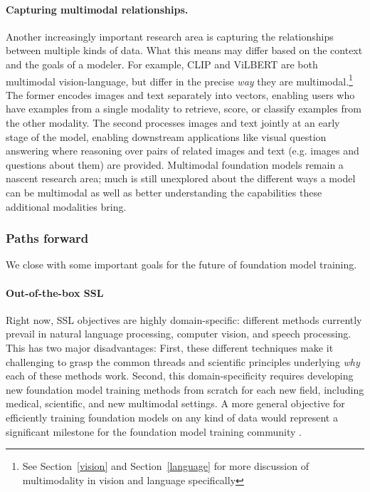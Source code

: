 \paragraph{Capturing multimodal relationships.} Another increasingly important research area is capturing the relationships between multiple kinds of data. What this means may differ based on the context and the goals of a modeler. For example, CLIP \citep{radford2021learning} and ViLBERT \citep{Lu2019ViLBERTPT} are both multimodal vision-language, but differ in the precise \textit{way} they are multimodal.\footnote{See Section~\ref{vision} and Section~\ref{language} for more discussion of multimodality in vision and language specifically} The former encodes images and text separately into vectors, enabling users who have examples from a single modality to retrieve, score, or classify examples from the other modality. The second processes images and text jointly at an early stage of the model, enabling downstream applications like visual question answering where reasoning over pairs of related images and text (e.g. images and questions about them) are provided. Multimodal foundation models remain a nascent research area; much is still unexplored about the different ways a model can be multimodal as well as better understanding the capabilities these additional modalities bring.

\subsubsection{Paths forward} We close with some important goals for the future of foundation model training.

\paragraph{Out-of-the-box SSL} Right now, SSL objectives are highly domain-specific: different methods currently prevail in natural language processing, computer vision, and speech processing. This has two major disadvantages: First, these different techniques make it challenging to grasp the common threads and scientific principles underlying \textit{why} each of these methods work. Second, this domain-specificity requires developing new foundation model training methods from scratch for each new field, including medical, scientific, and new multimodal settings. A more general objective for efficiently training foundation models on any kind of data would represent a significant milestone for the foundation model training community \citep{Tamkin2021DABS}.


